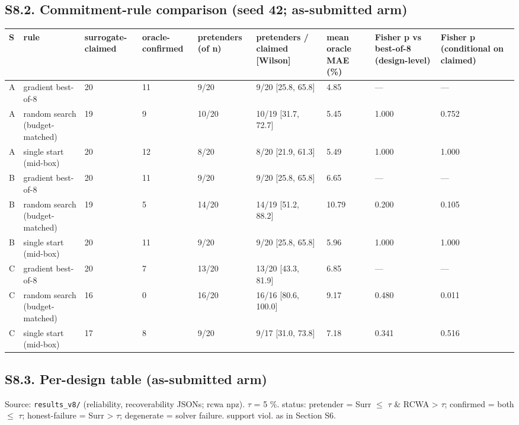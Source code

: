 \documentclass[11pt,a4paper]{article}
\newcounter{none}   %
\begin{document}
\begin{landscape}
\subsection*{S8.2. Commitment-rule comparison (seed 42; as-submitted arm)}

\begingroup
\setlength{\tabcolsep}{2pt}\tiny
{}
\label{stab:9}
{\def\LTcaptype{none} %
\begin{longtable}[]{@{}lllllllll@{}}
\toprule\noalign{}
S & rule & surrogate-claimed & oracle-confirmed & pretenders (of n) & pretenders / claimed {[}Wilson{]} & mean oracle MAE (\%) & Fisher p vs best-of-8 (design-level) & Fisher p (conditional on claimed) \\
\midrule\noalign{}
\endhead
\bottomrule\noalign{}
\endlastfoot
A & gradient best-of-8 & 20 & 11 & 9/20 & 9/20 {[}25.8, 65.8{]} & 4.85 & --- & --- \\
A & random search (budget-matched) & 19 & 9 & 10/20 & 10/19 {[}31.7, 72.7{]} & 5.45 & 1.000 & 0.752 \\
A & single start (mid-box) & 20 & 12 & 8/20 & 8/20 {[}21.9, 61.3{]} & 5.49 & 1.000 & 1.000 \\
B & gradient best-of-8 & 20 & 11 & 9/20 & 9/20 {[}25.8, 65.8{]} & 6.65 & --- & --- \\
B & random search (budget-matched) & 19 & 5 & 14/20 & 14/19 {[}51.2, 88.2{]} & 10.79 & 0.200 & 0.105 \\
B & single start (mid-box) & 20 & 11 & 9/20 & 9/20 {[}25.8, 65.8{]} & 5.96 & 1.000 & 1.000 \\
C & gradient best-of-8 & 20 & 7 & 13/20 & 13/20 {[}43.3, 81.9{]} & 6.85 & --- & --- \\
C & random search (budget-matched) & 16 & 0 & 16/20 & 16/16 {[}80.6, 100.0{]} & 9.17 & 0.480 & 0.011 \\
C & single start (mid-box) & 17 & 8 & 9/20 & 9/17 {[}31.0, 73.8{]} & 7.18 & 0.341 & 0.516 \\
\end{longtable}
}
\endgroup
\end{landscape}

\subsection*{S8.3. Per-design table (as-submitted arm)}

Source: \texttt{results\_v8/} (reliability, recoverability JSONs; rcwa npz). \ensuremath{\tau} = 5 \%. status: pretender = Surr \ensuremath{\leq} \ensuremath{\tau} \& RCWA \textgreater{} \ensuremath{\tau}; confirmed = both \ensuremath{\leq} \ensuremath{\tau}; honest-failure = Surr \textgreater{} \ensuremath{\tau}; degenerate = solver failure. support viol. as in Section S6.
\end{document}
